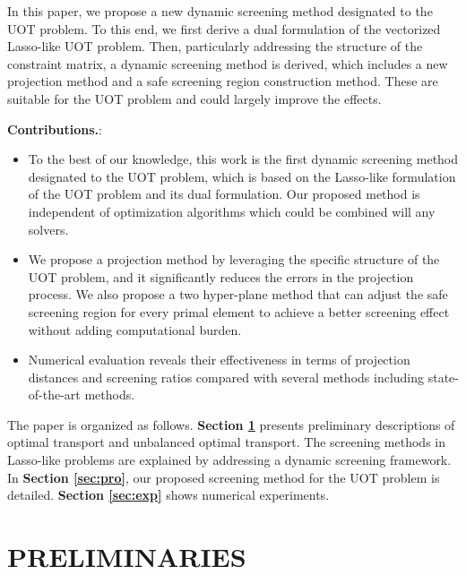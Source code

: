 \documentclass[twoside]{article}
\theoremstyle{plain}
\begin{document}
In this paper, we propose a new dynamic screening method designated to the UOT problem. To this end, we first derive a dual formulation of the vectorized Lasso-like UOT problem. Then, particularly addressing the structure of the constraint matrix, a dynamic screening method is derived, which includes a new projection method and a safe screening region construction method. These are suitable for the UOT problem and could largely improve the effects. %



\textbf{Contributions.}: 
\begin{itemize}
\item To the best of our knowledge, this work is the first dynamic screening method designated to the UOT problem, which is based on the Lasso-like formulation of the UOT problem and its dual formulation. Our proposed method is independent of optimization algorithms which could be combined will any solvers.
\item We propose a projection method by leveraging the specific structure of the UOT problem, and it significantly reduces the errors in the projection process.
We also propose a two hyper-plane method that can adjust the safe screening region for every primal element to achieve a better screening effect without adding computational burden.
\item Numerical evaluation reveals their effectiveness in terms of projection distances and screening ratios compared with several methods including state-of-the-art methods.
\end{itemize}


The paper is organized as follows. {\bf Section \ref{sec:pre}} presents preliminary descriptions of optimal transport and unbalanced optimal transport. The screening methods in Lasso-like problems are explained by addressing a dynamic screening framework. In {\bf Section \ref{sec:pro}}, our proposed screening method for the UOT problem is detailed. {\bf Section \ref{sec:exp}} shows numerical experiments.

\section{PRELIMINARIES}
\label{sec:pre}
\end{document}
